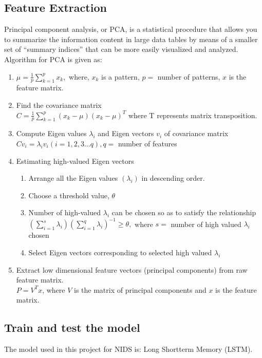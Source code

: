 \subsection{Feature Extraction}
\vspace{-18pt}
Principal component analysis, or PCA, is a statistical procedure that allows you to summarize the information content in large data tables by means of a smaller set of  “summary indices” that can be more easily visualized and analyzed.
Algorithm for PCA is given as:
\begin{enumerate}[label=\roman*.]
\item $\mu = \frac{1}{p} \sum_{k=1}^{p} x_{k},$ where, $x_{k}$ is a pattern, $p =$ number of patterns, $x$ is the feature matrix.
\item Find the covariance matrix\\
$ C = \frac{1}{p} \sum_{k=1}^{p}(x_{k} - \mu)(x_{k} - \mu)^{T}$ where T represents matrix transposition.
\item Compute Eigen values $\lambda_{i}$ and Eigen vectors $v_{i}$ of covariance matrix\\
$Cv_{i} = \lambda_{i}v_{i}$\quad \quad \quad \quad$ (i = 1,2,3...q), q =$ number of features
\item Estimating high-valued Eigen vectors
\begin{enumerate}
\item Arrange all the Eigen values $(\lambda_{i})$ in descending order.
\item Choose a threshold value, $\theta$
\item Number of high-valued $\lambda_{i}$ can be chosen so as to satisfy the relationship\\
$(\sum_{i=1}^{s}\lambda_{i})(\sum_{i=1}^{q}\lambda_{i})^{-1} \geq \theta,$ where $s = $ number of high valued $\lambda_{i}$ chosen 
\item Select Eigen vectors corresponding to selected high valued $\lambda_{i}$
\end{enumerate}
\item Extract low dimensional feature vectors (principal components) from raw feature matrix.\\
$P = V^{T}x$, where $V$ is the matrix of principal components and $x$ is the feature matrix.
\end{enumerate}
\subsection{Train and test the model}
\vspace{-18pt}
The model used in this project for NIDS is: Long Shortterm Memory (LSTM).
\par 
